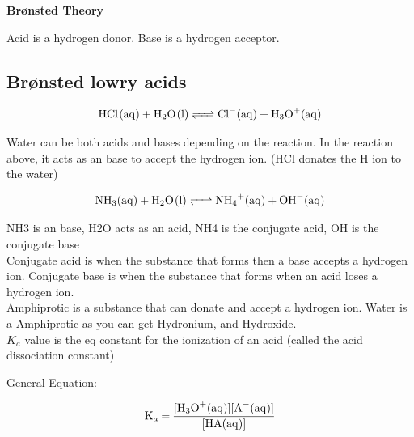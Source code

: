 \documentclass{article}
\begin{document}
\begin{paragraph}
\begin{center}
\end{center}

\textbf{Br{\o}nsted Theory}
\\
\begin{center}
  Acid is a hydrogen donor.
  Base is a hydrogen acceptor.
\end{center}
  \subsection{Br{\o}nsted lowry acids}
\begin{center}
  \begin{align*}
  \ce{HCl(aq) + H2O(l) <=> Cl-(aq) + H3O+(aq)}
  \end{align*}
\end{center}

Water can be both acids and bases depending on the reaction. In the reaction above, it acts as an base to accept the hydrogen ion. (HCl donates the H ion to the water)

\vspace{-1pc}
\begin{center}
  
  \begin{align*}
    \ce{ NH3(aq) + H2O(l) <=> NH4+(aq) + OH-(aq)}
  \end{align*}

\end{center}

NH3 is an base, H2O acts as an acid, NH4 is the conjugate acid, OH is the conjugate base\\

Conjugate acid is when the substance that forms then a base accepts a hydrogen ion.
Conjugate base is when the substance that forms when an acid loses a hydrogen ion.\\

Amphiprotic is a substance that can donate and accept a hydrogen ion. Water is a Amphiprotic as you can get Hydronium, and Hydroxide.\\

$K_a$ value is the eq constant for the ionization of an acid (called the acid dissociation constant)

\newpage
General Equation:
\begin{center}
\begin{equation}
\ce{K_a = \frac{[H3O^+(aq)][A^-(aq)]}{[HA(aq)]}}
\end{equation}
\end{center}
\noindent


\end{paragraph}
\end{document}
